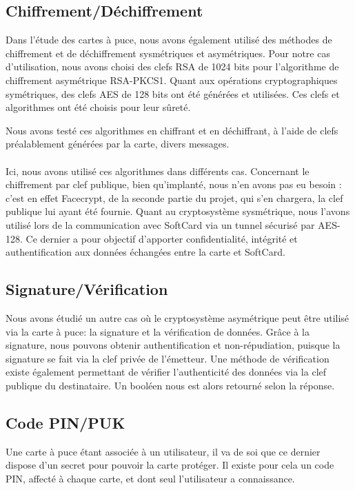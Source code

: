 \documentclass[a4paper,11pt,french]{article}
\begin{document}
\subsection{Chiffrement/Déchiffrement}
Dans l'étude des cartes à puce, nous avons également utilisé des méthodes de 
chiffrement et de déchiffrement sysmétriques et asymétriques. Pour notre cas 
d'utilisation, nous avons choisi des clefs RSA de 1024 bits pour l'algorithme de
chiffrement asymétrique RSA-PKCS1. Quant aux opérations cryptographiques 
symétriques, des clefs AES de 128 bits ont été générées et utilisées. Ces clefs
et algorithmes ont été choisis pour leur sûreté.

Nous avons testé ces algorithmes en chiffrant et en déchiffrant, à l'aide de 
clefs préalablement générées par la carte, divers messages. 

\paragraph{}
Ici, nous avons utilisé ces algorithmes dans différents cas. Concernant
le chiffrement par clef publique, bien qu'implanté, nous n'en avons pas eu 
besoin : c'est en effet Facecrypt, de la seconde partie du projet, qui s'en 
chargera, la clef publique lui ayant été fournie. Quant au cryptosystème 
sysmétrique, nous l'avons utilisé lors de la communication avec SoftCard
via un \og{}tunnel \fg{} sécurisé par AES-128. Ce dernier a pour objectif d'apporter 
confidentialité, intégrité et authentification aux données échangées entre la 
carte et SoftCard.

\subsection{Signature/Vérification}
Nous avons étudié un autre cas où le cryptosystème asymétrique peut être utilisé
via la carte à puce: la signature et la vérification de données. Grâce à la 
signature, nous pouvons obtenir authentification et non-répudiation, puisque la
signature se fait via la clef privée de l'émetteur. Une méthode de vérification
existe également permettant de vérifier l'authenticité des données via la clef 
publique du destinataire. Un booléen nous est alors retourné selon la réponse.

\label{CodePIN}
\subsection{Code PIN/PUK}
Une carte à puce étant associée à un utilisateur, il va de soi que ce dernier 
dispose d'un secret pour pouvoir la carte protéger. Il existe pour cela un code 
PIN, affecté à chaque carte, et dont seul l'utilisateur a connaissance.
\end{document}
